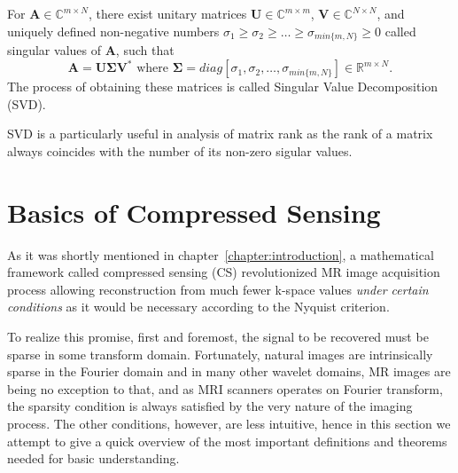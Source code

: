 \begin{tight_equations}
\begin{theorem}[SVD]
For $\mathbf{A} \in \mathbb{C}^{m \times N}$, there exist unitary matrices $\mathbf{U} \in \mathbb{C}^{m \times m}$, $\mathbf{V} \in \mathbb{C}^{N \times N}$, and uniquely defined non-negative numbers $\sigma_1 \ge \sigma_2 \ge \ldots \ge \sigma_{min\{m,N\}} \ge 0$ called singular values of $\mathbf{A}$, such that 
\[\mathbf{A} = \mathbf{U \Sigma V^*} \text{ where } \mathbf{\Sigma} = diag[\sigma_1, \sigma_2, \ldots, \sigma_{min\{m,N\}}] \in \mathbb{R}^{m \times N}.\]
The process of obtaining these matrices is called Singular Value Decomposition (SVD).
\end{theorem}

\begin{remark}
SVD is a particularly useful in analysis of matrix rank as the rank of a matrix always coincides with the number of its non-zero sigular values.
\end{remark}

\end{tight_equations}

\section{Basics of Compressed Sensing}
As it was shortly mentioned in chapter~\ref{chapter:introduction}, a mathematical framework called compressed sensing (CS) revolutionized MR image acquisition process allowing reconstruction from much fewer k-space values \textit{under certain conditions} as it would be necessary according to the Nyquist criterion.

To realize this promise, first and foremost, the signal to be recovered must be sparse in some transform domain. Fortunately, natural images are intrinsically sparse in the Fourier domain and in many other wavelet domains, MR images are being no exception to that, and as MRI scanners operates on Fourier transform, the sparsity condition is always satisfied by the very nature of the imaging process. The other conditions, however, are less intuitive, hence in this section we attempt to give a quick overview of the most important definitions and theorems needed for basic understanding.


